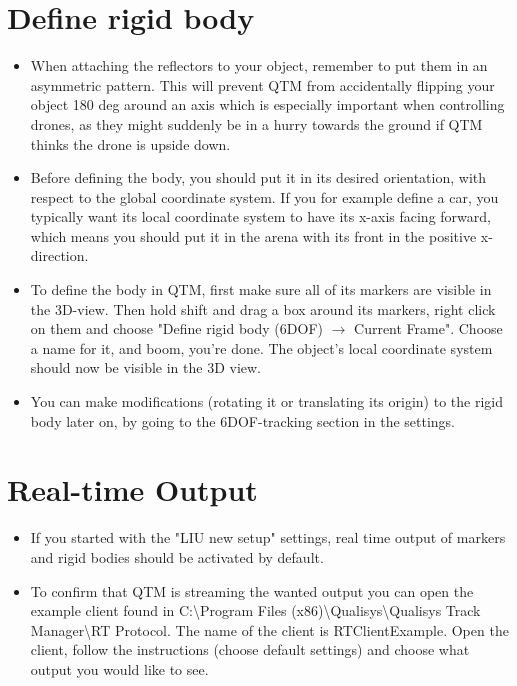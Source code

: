 \documentclass{article}
\begin{document}
\section{Define rigid body}
\begin{itemize}
    \item When attaching the reflectors to your object, remember to put them in an asymmetric pattern. This will prevent QTM from accidentally flipping your object 180 deg around an axis which is especially important when controlling drones, as they might suddenly be in a hurry towards the ground if QTM thinks the drone is upside down.
    \item Before defining the body, you should put it in its desired orientation, with respect to the global coordinate system. If you for example define a car, you typically want its local coordinate system to have its x-axis facing forward, which means you should put it in the arena with its front in the positive x-direction.
    \item To define the body in QTM, first make sure all of its markers are visible in the 3D-view. Then hold shift and drag a box around its markers, right click on them and choose "Define rigid body (6DOF) $\rightarrow$ Current Frame". Choose a name for it, and boom, you're done. The object's local coordinate system should now be visible in the 3D view.
    \item You can make modifications (rotating it or translating its origin) to the rigid body later on, by going to the 6DOF-tracking section in the settings.
\end{itemize}

\section{Real-time Output}
\begin{itemize}
    \item If you started with the "LIU new setup" settings, real time output of markers and rigid bodies should be activated by default.
    \item To confirm that QTM is streaming the wanted output you can open the example client found in C:\textbackslash Program Files (x86)\textbackslash Qualisys\textbackslash Qualisys Track Manager\textbackslash RT Protocol. The name of the client is RTClientExample. Open the client, follow the instructions (choose default settings) and choose what output you would like to see.
\end{itemize}
\end{document}
